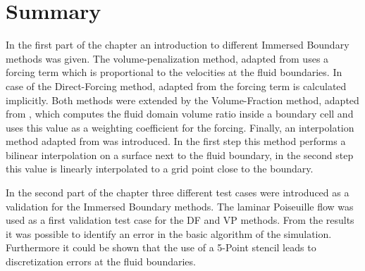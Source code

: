 
\clearpage

\section{Summary}

In the first part of the chapter an introduction to different Immersed Boundary methods was given.
The volume-penalization method, adapted from  \citep{Lulff2011} uses a forcing term which is proportional to the velocities at the fluid boundaries.
In case of the Direct-Forcing method, adapted from \citep{Fadlun2000} the forcing term is calculated implicitly.
Both methods were extended by the Volume-Fraction method, adapted from \citep{Fadlun2000}, which computes the fluid domain volume ratio inside a boundary
cell and uses this value as a weighting coefficient for the forcing.
Finally, an interpolation method adapted from  \citep{ Gilmanov2003} was introduced. In the first step this method performs a bilinear interpolation on a surface
next to the fluid boundary, in the second step this value is linearly interpolated to a grid point close to the boundary.

In the second part of the chapter three different test cases were introduced as a validation for the Immersed Boundary methods.
The laminar Poiseuille flow was used as a first validation test case for the DF and VP methods.
From the results it was possible to identify an error in the basic algorithm of the simulation.
Furthermore it could be shown that the use of a 5-Point stencil leads to discretization errors at the fluid boundaries.

